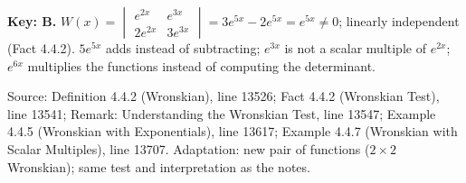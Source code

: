 \documentclass[11pt,a4paper]{article}
\newcommand{\Src}[1]{{\footnotesize\color{black!65}Source: #1}}
\begin{document}
\textbf{Key: B.} $W(x)=\begin{vmatrix}e^{2x}&e^{3x}\\2e^{2x}&3e^{3x}\end{vmatrix}=3e^{5x}-2e^{5x}=e^{5x}\neq0$; linearly independent (Fact 4.4.2). $5e^{5x}$ adds instead of subtracting; $e^{3x}$ is not a scalar multiple of $e^{2x}$; $e^{6x}$ multiplies the functions instead of computing the determinant.\par
\Src{Definition 4.4.2 (Wronskian), line 13526; Fact 4.4.2 (Wronskian Test), line 13541; Remark: Understanding the Wronskian Test, line 13547; Example 4.4.5 (Wronskian with Exponentials), line 13617; Example 4.4.7 (Wronskian with Scalar Multiples), line 13707. Adaptation: new pair of functions ($2\times2$ Wronskian); same test and interpretation as the notes.}\par
\end{document}
